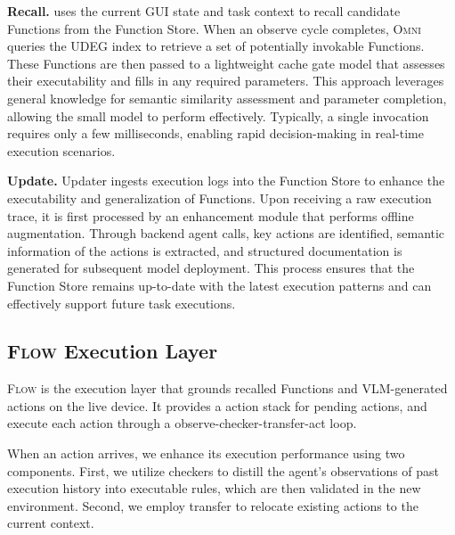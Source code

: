 \textbf{Recall.} \sysname uses the current GUI state and task context to recall candidate Functions from the Function Store. When an observe cycle completes, \textsc{Omni} queries the UDEG index to retrieve a set of potentially invokable Functions. These Functions are then passed to a lightweight cache gate model that assesses their executability and fills in any required parameters. This approach leverages general knowledge for semantic similarity assessment and parameter completion, allowing the small model to perform effectively. Typically, a single invocation requires only a few milliseconds, enabling rapid decision-making in real-time execution scenarios.

\textbf{Update.} Updater ingests execution logs into the Function Store to enhance the executability and generalization of Functions. Upon receiving a raw execution trace, it is first processed by an enhancement module that performs offline augmentation. Through backend agent calls, key actions are identified, semantic information of the actions is extracted, and structured documentation is generated for subsequent model deployment. This process ensures that the Function Store remains up-to-date with the latest execution patterns and can effectively support future task executions.


\subsection{\textsc{Flow} Execution Layer}
\label{sec:design-online}

\textsc{Flow} is the execution layer that grounds recalled Functions and VLM-generated actions on the live device. It provides a action stack for pending actions, and execute each action through a observe-checker-transfer-act loop. 

When an action arrives, we enhance its execution performance using two components. First, we utilize checkers to distill the agent's observations of past execution history into executable rules, which are then validated in the new environment. Second, we employ transfer to relocate existing actions to the current context.


